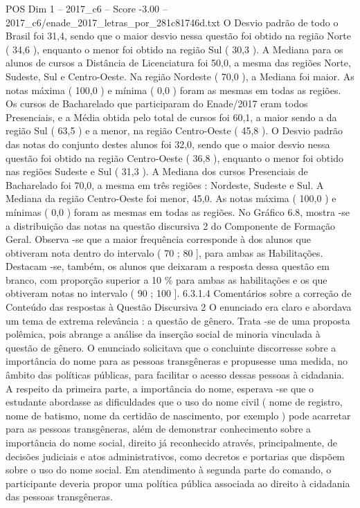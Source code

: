 \begin{textsample}{POS Dim 1 – 2017\_c6 – Score -3.00 – 2017\_c6/enade\_2017\_letras\_por\_281c81746d.txt}
O Desvio padrão de todo o Brasil foi 31,4, sendo que o maior desvio nessa questão foi obtido na região Norte ( 34,6 ), enquanto o menor foi obtido na região Sul ( 30,3 ).
A Mediana para os alunos de cursos a Distância de Licenciatura foi 50,0, a mesma das regiões Norte, Sudeste, Sul e Centro-Oeste.
Na região Nordeste ( 70,0 ), a Mediana foi maior.
As notas máxima ( 100,0 ) e mínima ( 0,0 ) foram as mesmas em todas as regiões.
Os cursos de Bacharelado que participaram do Enade/2017 eram todos Presenciais, e a Média obtida pelo total de cursos foi 60,1, a maior sendo a da região Sul ( 63,5 ) e a menor, na região Centro-Oeste ( 45,8 ).
O Desvio padrão das notas do conjunto destes alunos foi 32,0, sendo que o maior desvio nessa questão foi obtido na região Centro-Oeste ( 36,8 ), enquanto o menor foi obtido nas regiões Sudeste e Sul ( 31,3 ).
A Mediana dos cursos Presenciais de Bacharelado foi 70,0, a mesma em três regiões : Nordeste, Sudeste e Sul.
A Mediana da região Centro-Oeste foi menor, 45,0.
As notas máxima ( 100,0 ) e mínimas ( 0,0 ) foram as mesmas em todas as regiões.
No Gráfico 6.8, mostra -se a distribuição das notas na questão discursiva 2 do Componente de Formação Geral.
Observa -se que a maior frequência corresponde à dos alunos que obtiveram nota dentro do intervalo ( 70 ; 80 ], para ambas as Habilitações.
Destacam -se, também, os alunos que deixaram a resposta dessa questão em branco, com proporção superior a 10 \% para ambas as habilitações e os que obtiveram notas no intervalo ( 90 ; 100 ]. 6.3.1.4 Comentários sobre a correção de Conteúdo das respostas à Questão Discursiva 2 O enunciado era claro e abordava um tema de extrema relevância : a questão de gênero.
Trata -se de uma proposta polêmica, pois abrange a análise da inserção social de minoria vinculada à questão de gênero.
O enunciado solicitava que o concluinte discorresse sobre a importância do nome para as pessoas transgêneras e propusesse uma medida, no âmbito das políticas públicas, para facilitar o acesso dessas pessoas à cidadania.
A respeito da primeira parte, a importância do nome, esperava -se que o estudante abordasse as dificuldades que o uso do nome civil ( nome de registro, nome de batismo, nome da certidão de nascimento, por exemplo ) pode acarretar para as pessoas transgêneras, além de demonstrar conhecimento sobre a importância do nome social, direito já reconhecido através, principalmente, de decisões judiciais e atos administrativos, como decretos e portarias que dispõem sobre o uso do nome social.
Em atendimento à segunda parte do comando, o participante deveria propor uma política pública associada ao direito à cidadania das pessoas transgêneras.

\end{textsample}
